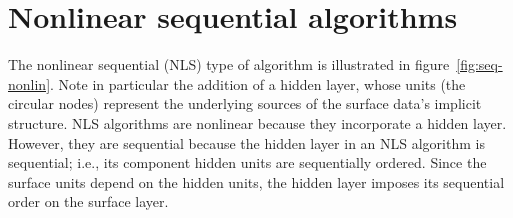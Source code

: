 

\section{Nonlinear sequential algorithms}
\label{subsec:seq-nonlin}
The nonlinear sequential (NLS) type of algorithm is illustrated in figure~\ref{fig:seq-nonlin}. 
Note in particular the addition of a hidden layer, whose units (the circular nodes)
represent the underlying sources of the surface data's implicit structure.
NLS algorithms are nonlinear because they incorporate a hidden layer.
However, they are sequential because the hidden layer in an NLS algorithm is sequential; i.e., its component hidden units
are sequentially ordered.
Since the surface units depend on the hidden units, the hidden layer imposes its sequential order on the surface layer. 

